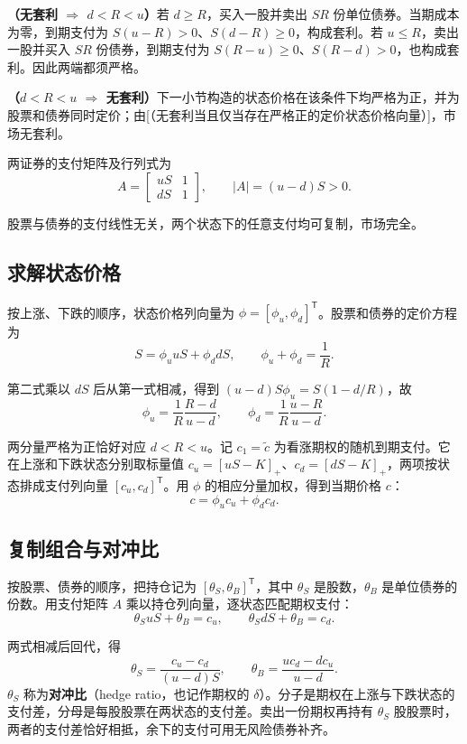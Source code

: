\textbf{（无套利 $\Rightarrow$ $d<R<u$）}若 $d\ge R$，买入一股并卖出 $SR$ 份单位债券。当期成本为零，到期支付为 $S(u-R)>0$、$S(d-R)\ge0$，构成套利。若 $u\le R$，卖出一股并买入 $SR$ 份债券，到期支付为 $S(R-u)\ge0$、$S(R-d)>0$，也构成套利。因此两端都须严格。

\textbf{（$d<R<u$ $\Rightarrow$ 无套利）}下一小节构造的状态价格在该条件下均严格为正，并为股票和债券同时定价；由[（无套利当且仅当存在严格正的定价状态价格向量）]，市场无套利。

两证券的支付矩阵及行列式为
\[
 A=\begin{bmatrix}uS&1\\dS&1\end{bmatrix},\qquad
 \lvert A\rvert=(u-d)S>0.
\]

股票与债券的支付线性无关，两个状态下的任意支付均可复制，市场完全。

\subsection{求解状态价格}
按上涨、下跌的顺序，状态价格列向量为 $\phi=[\phi_u,\phi_d]^{\mathsf T}$。股票和债券的定价方程为
\[
 S=\phi_u uS+\phi_d dS,\qquad \phi_u+\phi_d=\frac1R.
\]

第二式乘以 $dS$ 后从第一式相减，得到 $(u-d)S\phi_u=S(1-d/R)$，故
\[
 \phi_u=\frac1R\frac{R-d}{u-d},\qquad
 \phi_d=\frac1R\frac{u-R}{u-d}.
\]

两分量严格为正恰好对应 $d<R<u$。记 $c_1=\tilde c$ 为看涨期权的随机到期支付。它在上涨和下跌状态分别取标量值 $c_u=[uS-K]_+$、$c_d=[dS-K]_+$，两项按状态排成支付列向量 $[c_u,c_d]^{\mathsf T}$。用 $\phi$ 的相应分量加权，得到当期价格 $c$：
\begin{equation}
 c=\phi_u c_u+\phi_d c_d.
 \label{eq:wj-five-5}
\end{equation}

\subsection{复制组合与对冲比}
按股票、债券的顺序，把持仓记为 $[\theta_S,\theta_B]^{\mathsf T}$，其中 $\theta_S$ 是股数，$\theta_B$ 是单位债券的份数。用支付矩阵 $A$ 乘以持仓列向量，逐状态匹配期权支付：
\[
 \theta_SuS+\theta_B=c_u,\qquad \theta_SdS+\theta_B=c_d.
\]
\begin{tcolorbox}[knowledge,title=复制组合与对冲比]
两式相减后回代，得
\[
 \theta_S=\frac{c_u-c_d}{(u-d)S},\qquad
 \theta_B=\frac{uc_d-dc_u}{u-d}.
\]
$\theta_S$ 称为\textbf{对冲比}（hedge ratio，也记作期权的 $\delta$）。分子是期权在上涨与下跌状态的支付差，分母是每股股票在两状态的支付差。卖出一份期权再持有 $\theta_S$ 股股票时，两者的支付差恰好相抵，余下的支付可用无风险债券补齐。
\end{tcolorbox}

